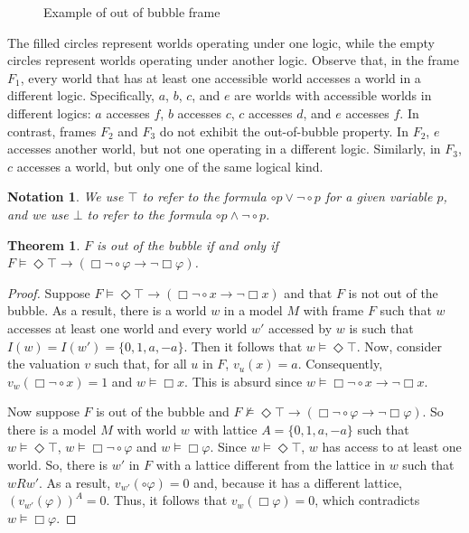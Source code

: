 \documentclass{amsart}
\newtheorem{theorem}{Theorem}[section]
\newtheorem{notation}{Notation}[section]
\newcommand{\so}{\rightarrow}
\begin{document}
\begin{figure}[H]
\begin{tikzpicture}[x=0.75pt,y=0.75pt,yscale=-1,xscale=1]
\end{tikzpicture}
    \caption{Example of out of bubble frame}
    \label{fig-example}
\end{figure}

The filled circles represent worlds operating under one logic, while the empty circles represent worlds operating under another logic. Observe that, in the frame $F_1$, every world that has at least one accessible world accesses a world in a different logic. Specifically, $a$, $b$, $c$, and $e$ are worlds with accessible worlds in different logics: $a$ accesses $f$, $b$ accesses $c$, $c$ accesses $d$, and $e$ accesses $f$. In contrast, frames $F_2$ and $F_3$ do not exhibit the out-of-bubble property. In $F_2$, $e$ accesses another world, but not one operating in a different logic. Similarly, in $F_3$, $c$ accesses a world, but only one of the same logical kind.

\begin{notation}
    We use $\top$ to refer to the formula $\circ p \lor \lnot \circ p$ for a given variable $p$, and we use $\bot$ to refer to the formula $\circ p \land \lnot \circ p$.
\end{notation}

\begin{theorem}\label{outofbubble}
    $F$ is out of the bubble if and only if $F \vDash \Diamond \top \so (\Box \lnot \circ \varphi \so \lnot \Box \varphi)$.
\end{theorem}

\begin{proof}
    Suppose $F \vDash \Diamond \top \so (\Box \lnot \circ x \so \lnot \Box x)$ and that $F$ is not out of the bubble. 
    As a result, there is a world $w$ in a model $M$ with frame $F$ such that $w$ accesses at least one world and every world $w'$ accessed by $w$ is such that $I(w) = I(w') = \{0,1,a,-a\}$. Then it follows that $w \vDash \Diamond \top$. Now, consider the valuation $v$ such that, for all $u$ in $F$, $v_u(x) = a$. Consequently, $v_w(\Box \lnot \circ x) = 1$ and $w \vDash \Box x$. This is absurd since $w \vDash \Box \lnot \circ x \so \lnot \Box x$.

    Now suppose $F$ is out of the bubble and $F \nvDash \Diamond \top \so (\Box \lnot \circ \varphi \so \lnot \Box \varphi)$. So there is a model $M$ with world $w$ with lattice $A = \{0,1,a,-a\}$ such that $w \vDash \Diamond \top$, $w \vDash \Box \lnot \circ \varphi$ and $w \vDash \Box \varphi$. Since $w \vDash \Diamond \top$, $w$ has access to at least one world. So, there is $w'$ in $F$ with a lattice different from the lattice in $w$ such that $w R w'$. As a result, $v_{w'}(\circ \varphi) = 0$ and, because it has a different lattice, $(v_{w'}(\varphi))^A = 0$. Thus, it follows that $v_w(\Box \varphi) = 0$, which contradicts $w \vDash \Box \varphi$.
\end{proof}
\end{document}
